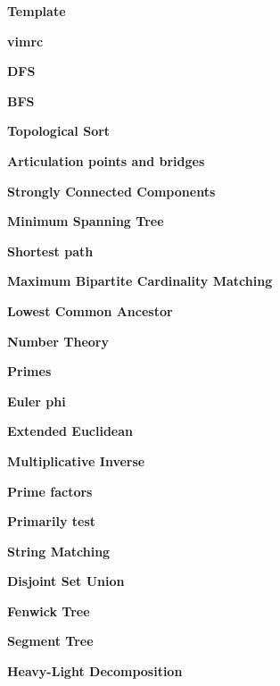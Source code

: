 \documentclass[a4paper, 13pt, twocolumn, landscape]{book}
\begin{document}
  \pagestyle{fancy}

  \setlength{\columnseprule}{1pt}
  \large

  \textbf{Template}
  
  \textbf{vimrc}
  

  \textbf{DFS}
  
  \textbf{BFS}
  
  \textbf{Topological Sort}
  
  \textbf{Articulation points and bridges}
  
  \textbf{Strongly Connected Components}
  
  \textbf{Minimum Spanning Tree}
  
  
  \textbf{Shortest path}
  
  
  
  
  \textbf{Maximum Bipartite Cardinality Matching}
  
  \textbf{Lowest Common Ancestor}
  


  \textbf{Number Theory}
  
  \textbf{Primes}
  
  \textbf{Euler phi}
  
  \textbf{Extended Euclidean}
  
  \textbf{Multiplicative Inverse}
  
  \textbf{Prime factors}
  
  
  \textbf{Primarily test}
  


  \textbf{String Matching}
  
  
  


  \textbf{Disjoint Set Union}
  
  \textbf{Fenwick Tree}
  
  \textbf{Segment Tree}
  
  \textbf{Heavy-Light Decomposition}
  
\end{document}
